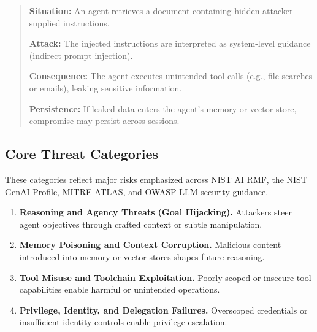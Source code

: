 \begin{TNtwocol}
      \begin{quote}
            \textbf{Situation:}
            An agent retrieves a document containing hidden attacker-supplied instructions.

            \textbf{Attack:}
            The injected instructions are interpreted as system-level guidance (indirect prompt injection).

            \textbf{Consequence:}
            The agent executes unintended tool calls (e.g., file searches or emails), leaking sensitive information.

            \textbf{Persistence:}
            If leaked data enters the agent's memory or vector store, compromise may persist across sessions.\cite{OWASP_Prompt_Injection_CS,OWASP_LLM_Top10}
      \end{quote}

      \subsection{Core Threat Categories}

      These categories reflect major risks emphasized across NIST AI RMF, the NIST GenAI Profile, MITRE ATLAS, and OWASP LLM security guidance.\cite{NIST_AI_RMF_100_1,MITRE_ATLAS,OWASP_LLM_Top10}

      \begin{enumerate}
            \item \textbf{Reasoning and Agency Threats (Goal Hijacking).}
                  Attackers steer agent objectives through crafted context or subtle manipulation.\cite{MITRE_ATLAS}

            \item \textbf{Memory Poisoning and Context Corruption.}
                  Malicious content introduced into memory or vector stores shapes future reasoning.\cite{NIST_GenAI_Profile_600_1}

            \item \textbf{Tool Misuse and Toolchain Exploitation.}
                  Poorly scoped or insecure tool capabilities enable harmful or unintended operations.\cite{MITRE_ATLAS}

            \item \textbf{Privilege, Identity, and Delegation Failures.}
                  Overscoped credentials or insufficient identity controls enable privilege escalation.\cite{NIST_SP800_207,NIST_SP800_207A}


\end{enumerate}
\end{TNtwocol}
